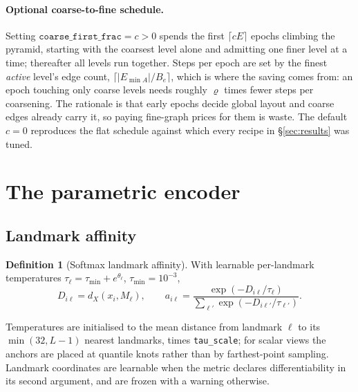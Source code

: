 \documentclass[12pt]{iopart}
\theoremstyle{definition}
\newtheorem{definition}{Definition}
\theoremstyle{plain}
\theoremstyle{remark}
\newcommand{\abs}[1]{\left\lvert#1\right\rvert}
\newcommand{\code}[1]{\texttt{#1}}
\begin{document}
\paragraph{Optional coarse-to-fine schedule.}
Setting $\code{coarse\_first\_frac}=c>0$ spends the first $\lceil cE\rceil$
epochs climbing the pyramid, starting with the coarsest level alone and
admitting one finer level at a time; thereafter all levels run together. Steps
per epoch are set by the finest \emph{active} level's edge count,
$\lceil\abs{E_{\min A}}/B_e\rceil$, which is where the saving comes from: an
epoch touching only coarse levels needs roughly $\varrho$ times fewer steps per
coarsening. The rationale is that early epochs decide global layout and coarse
edges already carry it, so paying fine-graph prices for them is waste. The
default $c=0$ reproduces the flat schedule against which every recipe in
\S\ref{sec:results} was tuned.

\section{The parametric encoder}
\label{sec:model}

\subsection{Landmark affinity}
\label{sec:affinity}

\begin{definition}[Softmax landmark affinity]
\label{def:affinity}
With learnable per-landmark temperatures
$\tau_\ell = \tau_{\min}+e^{\theta_\ell}$, $\tau_{\min}=10^{-3}$,
\begin{equation}
\label{eq:affinity}
D_{i\ell}=d_X(x_i,M_\ell),
\qquad
a_{i\ell}
=
\frac{\exp(-D_{i\ell}/\tau_\ell)}
     {\sum_{\ell'}\exp(-D_{i\ell'}/\tau_{\ell'})}.
\end{equation}
\end{definition}

Temperatures are initialised to the mean distance from landmark $\ell$ to its
$\min(32,L-1)$ nearest landmarks, times \code{tau\_scale}; for scalar views the
anchors are placed at quantile knots rather than by farthest-point sampling.
Landmark coordinates are learnable when the metric declares differentiability
in its second argument, and are frozen with a warning otherwise.
\end{document}
